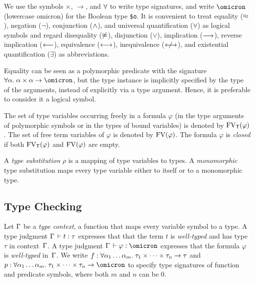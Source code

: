 We use the symbols ${\times}$, ${\to}$, and ${\forall}$
to write type signatures, and write $\omicron$ (lowercase omicron) for the
Boolean type {\tt \$o}. It is convenient to treat
equality ($\approx$), negation ($\lnot$), conjunction ($\mathrel{\land}$), and universal
quantification ($\forall$) as logical symbols and regard disequality
($\not\approx$), disjunction ($\lor$), implication ($\longrightarrow$), reverse implication
($\longleftarrow$), equivalence ($\longleftrightarrow$), inequivalence ($\mathrel{\kern1.1ex\not\kern-1.1ex\longleftrightarrow}$), and existential
quantification ($\exists$) as abbreviations.

Equality can be seen as a polymorphic predicate with the signature
$\forall\alpha.\; \alpha\times\alpha\to\omicron$, but the type instance is
implicitly specified by the type of the arguments, instead of explicitly via a
type argument. Hence, it is preferable to consider it a logical
symbol.

The set of type variables occurring freely in a formula $\varphi$
(in the type arguments of polymorphic symbols or
in the types of bound variables) is denoted by $\mathrm{FV}_\mathsf{T}(\varphi)$.
The set of free term variables of $\varphi$
is denoted by $\mathrm{FV}(\varphi)$. The formula $\varphi$ is {\em closed\/}
if both $\mathrm{FV}_\mathsf{T}(\varphi)$ and $\mathrm{FV}(\varphi)$ are empty.

A {\em type substitution\/} $\rho$ is a mapping of type variables
to types. A {\em monomorphic\/} type substitution
maps every type variable either to itself or to a monomorphic type.
%
%

\subsection{Type Checking}

Let $\mathrm{\Gamma}$ be a {\em type context}, a function that maps
every variable symbol to a type.
A type judgment $\mathrm{\Gamma} \,\vdash t \mathrel{:} \tau$ expresses that that the term $t$
is {\em well-typed\/} and has type $\tau$ in context~$\mathrm{\Gamma}$.
A type judgment $\GAM \,\vdash \varphi \ty \omicron$ expresses that the formula
$\varphi$ is {\em well-typed\/} in~$\mathrm{\Gamma}$.
We write $f \mathrel{:} \forall \alpha_1\dots\alpha_m .\;
\tau_1 \times \dots \times \tau_n \to \tau$ and
$p \ty \forall \alpha_1\dots\alpha_m .\;
\tau_1 \times \dots \times \tau_n \to \omicron$ to specify
type signatures of function and predicate symbols,
where both $m$ and $n$ can be 0.

